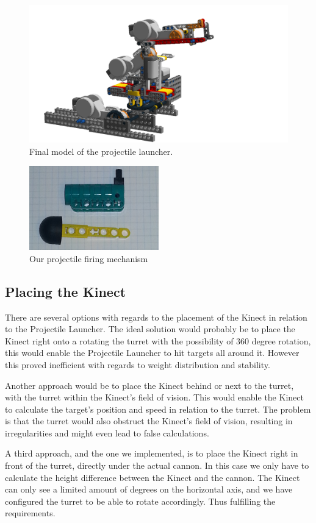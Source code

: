 \begin{figure}[hptb]
  \centering
    \includegraphics[width=1.0\textwidth]{img/design_turret4.png}
  \caption{Final model of the projectile launcher.}
  \label{final_model}
\end{figure}

\begin{figure}[hptb]
  \centering
    \includegraphics[width=0.5\textwidth]{img/competition_cannon.png}
  \caption{Our projectile firing mechanism}
  \label{competition_cannon}
\end{figure}

\subsection{Placing the Kinect} %
\label{sub:placing_the_kinect}
There are several options with regards to the placement of the Kinect in relation to the Projectile Launcher. The ideal solution would probably be to place the Kinect right onto a rotating the turret with the possibility of 360 degree rotation, this would enable the Projectile Launcher to hit targets all around it. However this proved inefficient with regards to weight distribution and stability.

Another approach would be to place the Kinect behind or next to the turret, with the turret within the Kinect's field of vision. This would enable the Kinect to calculate the target's position and speed in relation to the turret. The problem is that the turret would also obstruct the Kinect's field of vision, resulting in irregularities and might even lead to false calculations.

A third approach, and the one we implemented, is to place the Kinect right in front of the turret, directly under the actual cannon. In this case we only have to calculate the height difference between the Kinect and the cannon. The Kinect can only see a limited amount of degrees on the horizontal axis, and we have configured the turret to be able to rotate accordingly. Thus fulfilling the requirements.
